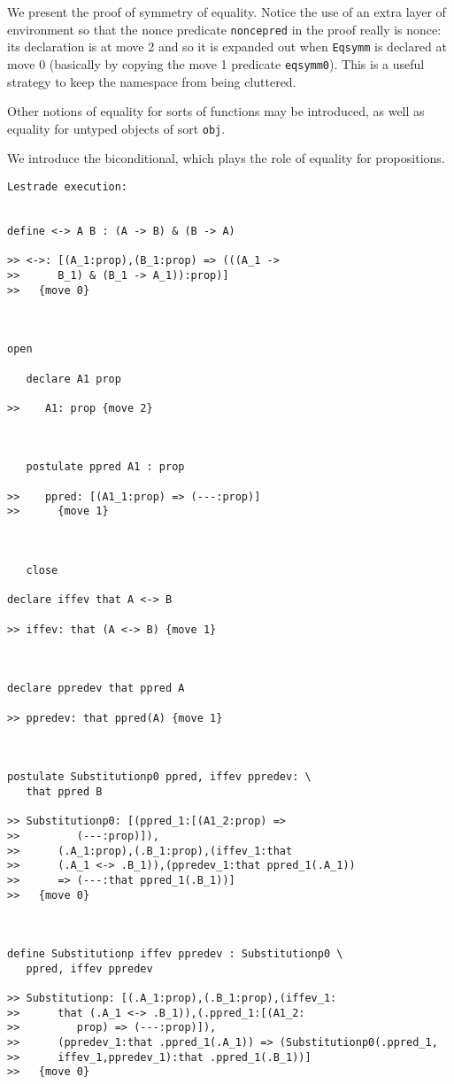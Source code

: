 \documentclass[12pt]{article}
\begin{document}
We present the proof of symmetry of equality.  Notice the use of an extra layer of environment so that the nonce predicate {\tt noncepred} in the proof really is nonce:  its declaration is at move 2 and so it is expanded out when {\tt Eqsymm} is declared at move 0 (basically by copying the move 1 predicate {\tt eqsymm0}).  This is a useful strategy to keep the namespace from being cluttered.

Other notions of equality for sorts of functions may be introduced, as well as equality for untyped objects of sort {\tt obj}.

We introduce the biconditional, which plays the role of equality for propositions.

\begin{verbatim}Lestrade execution:


define <-> A B : (A -> B) & (B -> A)

>> <->: [(A_1:prop),(B_1:prop) => (((A_1 ->
>>      B_1) & (B_1 -> A_1)):prop)]
>>   {move 0}



open

   declare A1 prop

>>    A1: prop {move 2}



   postulate ppred A1 : prop

>>    ppred: [(A1_1:prop) => (---:prop)]
>>      {move 1}



   close

declare iffev that A <-> B

>> iffev: that (A <-> B) {move 1}



declare ppredev that ppred A

>> ppredev: that ppred(A) {move 1}



postulate Substitutionp0 ppred, iffev ppredev: \
   that ppred B

>> Substitutionp0: [(ppred_1:[(A1_2:prop) =>
>>         (---:prop)]),
>>      (.A_1:prop),(.B_1:prop),(iffev_1:that
>>      (.A_1 <-> .B_1)),(ppredev_1:that ppred_1(.A_1))
>>      => (---:that ppred_1(.B_1))]
>>   {move 0}



define Substitutionp iffev ppredev : Substitutionp0 \
   ppred, iffev ppredev

>> Substitutionp: [(.A_1:prop),(.B_1:prop),(iffev_1:
>>      that (.A_1 <-> .B_1)),(.ppred_1:[(A1_2:
>>         prop) => (---:prop)]),
>>      (ppredev_1:that .ppred_1(.A_1)) => (Substitutionp0(.ppred_1,
>>      iffev_1,ppredev_1):that .ppred_1(.B_1))]
>>   {move 0}




\end{verbatim}
\end{document}
